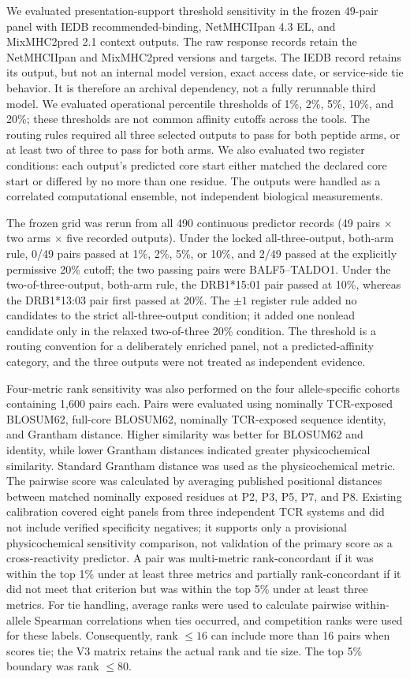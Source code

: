 \documentclass[11pt]{article}
\begin{document}
We evaluated presentation-support threshold sensitivity in the frozen 49-pair panel with IEDB recommended-binding, NetMHCIIpan 4.3 EL, and MixMHC2pred 2.1 context outputs. The raw response records retain the NetMHCIIpan and MixMHC2pred versions and targets. The IEDB record retains its output, but not an internal model version, exact access date, or service-side tie behavior. It is therefore an archival dependency, not a fully rerunnable third model. We evaluated operational percentile thresholds of 1\%, 2\%, 5\%, 10\%, and 20\%; these thresholds are not common affinity cutoffs across the tools. The routing rules required all three selected outputs to pass for both peptide arms, or at least two of three to pass for both arms. We also evaluated two register conditions: each output's predicted core start either matched the declared core start or differed by no more than one residue. The outputs were handled as a correlated computational ensemble, not independent biological measurements.

The frozen grid was rerun from all 490 continuous predictor records (49 pairs $\times$ two arms $\times$ five recorded outputs). Under the locked all-three-output, both-arm rule, 0/49 pairs passed at 1\%, 2\%, 5\%, or 10\%, and 2/49 passed at the explicitly permissive 20\% cutoff; the two passing pairs were BALF5--TALDO1. Under the two-of-three-output, both-arm rule, the DRB1*15:01 pair passed at 10\%, whereas the DRB1*13:03 pair first passed at 20\%. The $\pm1$ register rule added no candidates to the strict all-three-output condition; it added one nonlead candidate only in the relaxed two-of-three 20\% condition. The threshold is a routing convention for a deliberately enriched panel, not a predicted-affinity category, and the three outputs were not treated as independent evidence.

Four-metric rank sensitivity was also performed on the four allele-specific cohorts containing 1,600 pairs each. Pairs were evaluated using nominally TCR-exposed BLOSUM62, full-core BLOSUM62, nominally TCR-exposed sequence identity, and Grantham distance. Higher similarity was better for BLOSUM62 and identity, while lower Grantham distances indicated greater physicochemical similarity. Standard Grantham distance \cite{grantham} was used as the physicochemical metric. The pairwise score was calculated by averaging published positional distances between matched nominally exposed residues at P2, P3, P5, P7, and P8. Existing calibration covered eight panels from three independent TCR systems and did not include verified specificity negatives; it supports only a provisional physicochemical sensitivity comparison, not validation of the primary score as a cross-reactivity predictor. A pair was multi-metric rank-concordant if it was within the top 1\% under at least three metrics and partially rank-concordant if it did not meet that criterion but was within the top 5\% under at least three metrics. For tie handling, average ranks were used to calculate pairwise within-allele Spearman correlations when ties occurred, and competition ranks were used for these labels. Consequently, rank $\leq16$ can include more than 16 pairs when scores tie; the V3 matrix retains the actual rank and tie size. The top 5\% boundary was rank $\leq80$.
\end{document}
